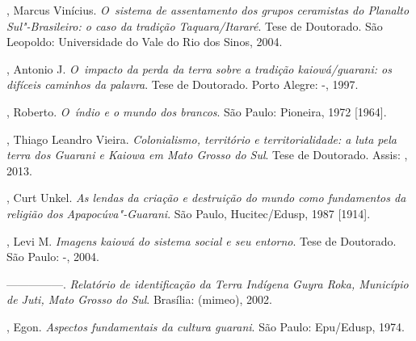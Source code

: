\begin{Parskip}
, Marcus Vinícius. \emph{O~sistema de assentamento dos grupos ceramistas
do Planalto Sul"-Brasileiro: o caso da tradição Taquara/Itararé}. Tese de
Doutorado. São Leopoldo: Universidade do Vale do Rio dos Sinos, 2004.

, Antonio J. \emph{O~impacto da perda da terra sobre a tradição
kaiowá/guarani: os difíceis caminhos da palavra}. Tese de Doutorado.
Porto Alegre: -, 1997.

, Roberto. \emph{O~índio e o mundo dos brancos}. São Paulo:
Pioneira, 1972 [1964].

, Thiago Leandro Vieira. \emph{Colonialismo, território e
territorialidade: a luta pela terra dos Guarani e Kaiowa em Mato Grosso
do Sul}. Tese de Doutorado. Assis: , 2013.

, Curt Unkel. \emph{As lendas da criação e destruição do mundo como
fundamentos da religião dos Apapocúva"-Guarani}. São Paulo,
Hucitec/Edusp, 1987 [1914].

, Levi M. \emph{Imagens kaiowá do sistema social e seu entorno}. Tese de
Doutorado. São Paulo: -, 2004.

—————. \emph{Relatório de identificação da Terra Indígena Guyra Roka,
Município de Juti, Mato Grosso do Sul}. Brasília:  (mimeo), 2002.

, Egon. \emph{Aspectos fundamentais da cultura guarani}. São Paulo:
Epu/Edusp, 1974.
\end{Parskip}

\clearpage

\vspace*{\fill}

